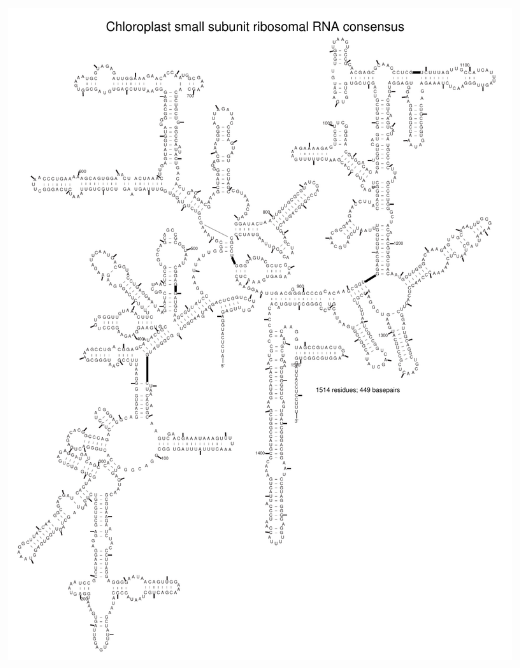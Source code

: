 \begin{center}
\newpage
\includegraphics[height=8.5in]{../../seeds/ss-diagrams/chloroplast-0p1}


\end{center}
